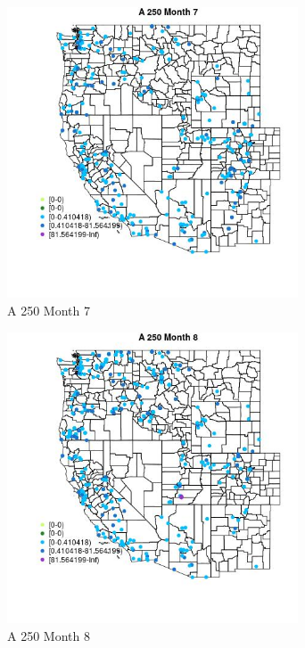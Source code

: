 \begin{figure} 
\centering  
\includegraphics[width=0.77\textwidth]{Code_Outputs/Report_ML_input_PM25_Step4_part_e_de_duplicated_aveswNAs_MapObsMo7A_250.jpg} 
\caption{\label{fig:Report_ML_input_PM25_Step4_part_e_de_duplicated_aveswNAsMapObsMo7A_250}A 250 Month 7} 
\end{figure} 
 

\begin{figure} 
\centering  
\includegraphics[width=0.77\textwidth]{Code_Outputs/Report_ML_input_PM25_Step4_part_e_de_duplicated_aveswNAs_MapObsMo8A_250.jpg} 
\caption{\label{fig:Report_ML_input_PM25_Step4_part_e_de_duplicated_aveswNAsMapObsMo8A_250}A 250 Month 8} 
\end{figure} 
 

